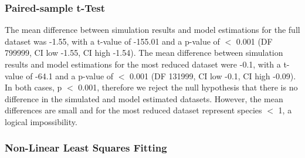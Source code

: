 \documentclass{article}
\begin{document}
\subsubsection{Paired-sample t-Test}

\begin{table}[h!]
\caption{Paired-sample t-test for simulation data and model estimations}
\centering
{}
   \end{table}\bigskip
   
\noindent The mean difference between simulation results and model estimations for the full dataset was -1.55, with a t-value of -155.01 and a p-value of $<$ 0.001 (DF 799999, CI low -1.55, CI high -1.54). The mean difference between simulation results and model estimations for the most reduced dataset were -0.1, with a t-value of -64.1 and a p-value of $<$ 0.001 (DF 131999, CI low -0.1, CI high -0.09). In both cases, p $<$ 0.001, therefore we reject the null hypothesis that there is no difference in the simulated and model estimated datasets. However, the mean differences are small and for the most reduced dataset represent species $<$ 1, a logical impossibility.  

\subsubsection{Non-Linear Least Squares Fitting}      
   
\end{document}
